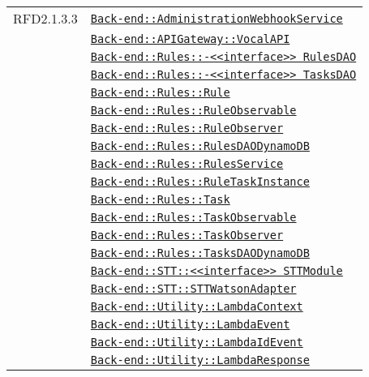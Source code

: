 \begin{longtable}{|>{\centering}m{3cm}|m{10cm}<{\centering}|}
RFD2.1.3.3 & \hyperref[Back-end::AdministrationWebhookService]{\texttt{Back-end::AdministrationWebhookService}}\\
& \hyperref[Back-end::APIGateway::VocalAPI]{\texttt{Back-end::APIGateway::VocalAPI}}\\
& \hyperref[Back-end::Rules::<<interface>> RulesDAO]{\texttt{Back-end::Rules::-\linebreak <<interface>> RulesDAO}}\\
& \hyperref[Back-end::Rules::<<interface>> TasksDAO]{\texttt{Back-end::Rules::-\linebreak <<interface>> TasksDAO}}\\
& \hyperref[Back-end::Rules::Rule]{\texttt{Back-end::Rules::Rule}}\\
& \hyperref[Back-end::Rules::RuleObservable]{\texttt{Back-end::Rules::RuleObservable}}\\
& \hyperref[Back-end::Rules::RuleObserver]{\texttt{Back-end::Rules::RuleObserver}}\\
& \hyperref[Back-end::Rules::RulesDAODynamoDB]{\texttt{Back-end::Rules::RulesDAODynamoDB}}\\
& \hyperref[Back-end::Rules::RulesService]{\texttt{Back-end::Rules::RulesService}}\\
& \hyperref[Back-end::Rules::RuleTaskInstance]{\texttt{Back-end::Rules::RuleTaskInstance}}\\
& \hyperref[Back-end::Rules::Task]{\texttt{Back-end::Rules::Task}}\\
& \hyperref[Back-end::Rules::TaskObservable]{\texttt{Back-end::Rules::TaskObservable}}\\
& \hyperref[Back-end::Rules::TaskObserver]{\texttt{Back-end::Rules::TaskObserver}}\\
& \hyperref[Back-end::Rules::TasksDAODynamoDB]{\texttt{Back-end::Rules::TasksDAODynamoDB}}\\
& \hyperref[Back-end::STT::<<interface>> STTModule]{\texttt{Back-end::STT::<<interface>> STTModule}}\\
& \hyperref[Back-end::STT::STTWatsonAdapter]{\texttt{Back-end::STT::STTWatsonAdapter}}\\
& \hyperref[Back-end::Utility::LambdaContext]{\texttt{Back-end::Utility::LambdaContext}}\\
& \hyperref[Back-end::Utility::LambdaEvent]{\texttt{Back-end::Utility::LambdaEvent}}\\
& \hyperref[Back-end::Utility::LambdaIdEvent]{\texttt{Back-end::Utility::LambdaIdEvent}}\\
& \hyperref[Back-end::Utility::LambdaResponse]{\texttt{Back-end::Utility::LambdaResponse}}\\

\end{longtable}
